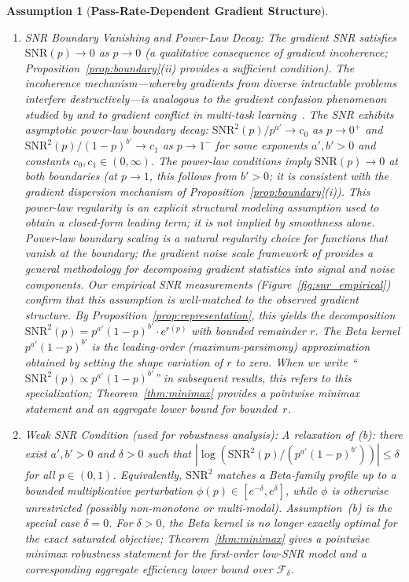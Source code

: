 \documentclass{article}
\newtheorem{assumption}{Assumption}
\begin{document}
\begin{assumption}[\textbf{Pass-Rate-Dependent Gradient Structure}]
\begin{enumerate}
 \item[(b)] \emph{SNR Boundary Vanishing and Power-Law Decay:} The gradient SNR satisfies $\text{SNR}(p) \to 0$ as $p \to 0$ (a qualitative consequence of gradient incoherence; Proposition~\ref{prop:boundary}(ii) provides a sufficient condition). The incoherence mechanism---whereby gradients from diverse intractable problems interfere destructively---is analogous to the gradient confusion phenomenon studied by \citet{sankararaman2020gradient} and to gradient conflict in multi-task learning~\citep{yu2020gradient}. The SNR exhibits asymptotic power-law boundary decay: $\text{SNR}^2(p)/p^{a'} \to c_0$ as $p \to 0^+$ and $\text{SNR}^2(p)/(1-p)^{b'} \to c_1$ as $p \to 1^-$ for some exponents $a', b' > 0$ and constants $c_0, c_1 \in (0,\infty)$. The power-law conditions imply $\text{SNR}(p) \to 0$ at both boundaries (at $p \to 1$, this follows from $b' > 0$; it is consistent with the gradient dispersion mechanism of Proposition~\ref{prop:boundary}(i)). This power-law regularity is an explicit structural modeling assumption used to obtain a closed-form leading term; it is not implied by smoothness alone. Power-law boundary scaling is a natural regularity choice for functions that vanish at the boundary; the gradient noise scale framework of \citet{mccandlish2018empirical} provides a general methodology for decomposing gradient statistics into signal and noise components. Our empirical SNR measurements (Figure~\ref{fig:snr_empirical}) confirm that this assumption is well-matched to the observed gradient structure. By Proposition~\ref{prop:representation}, this yields the decomposition $\text{SNR}^2(p) = p^{a'}(1-p)^{b'} \cdot e^{r(p)}$ with bounded remainder $r$. The Beta kernel $p^{a'}(1-p)^{b'}$ is the leading-order (maximum-parsimony) approximation obtained by setting the shape variation of $r$ to zero. When we write ``$\text{SNR}^2(p) \propto p^{a'}(1-p)^{b'}$'' in subsequent results, this refers to this specialization; Theorem~\ref{thm:minimax} provides a pointwise minimax statement and an aggregate lower bound for bounded~$r$.

 \item[(b$'$)] \emph{Weak SNR Condition (used for robustness analysis):} A relaxation of (b): there exist $a', b' > 0$ and $\delta > 0$ such that\/ $|\log(\text{SNR}^2(p)/(p^{a'}(1-p)^{b'}))| \leq \delta$ for all $p \in (0,1)$. Equivalently, $\text{SNR}^2$ matches a Beta-family profile up to a bounded multiplicative perturbation $\phi(p) \in [e^{-\delta}, e^{\delta}]$, while $\phi$ is otherwise unrestricted (possibly non-monotone or multi-modal). Assumption~(b) is the special case $\delta = 0$. For $\delta > 0$, the Beta kernel is no longer exactly optimal for the exact saturated objective; Theorem~\ref{thm:minimax} gives a pointwise minimax robustness statement for the first-order low-SNR model and a corresponding aggregate efficiency lower bound over $\mathcal{F}_\delta$.


\end{enumerate}
\end{assumption}
\end{document}
